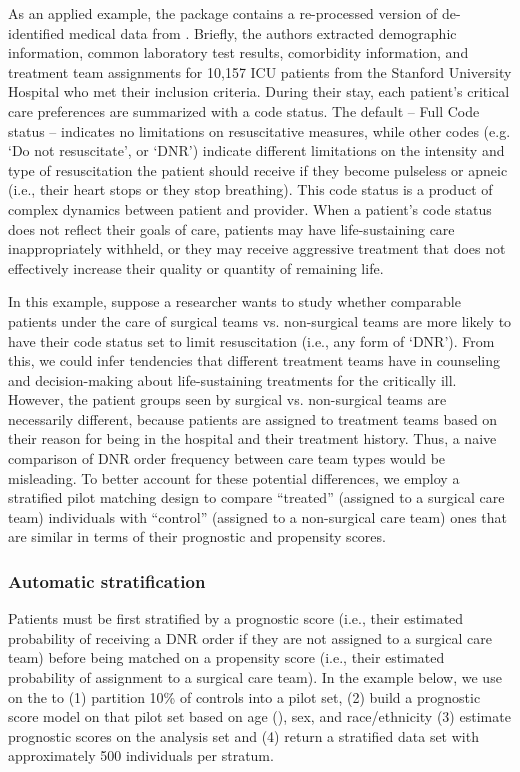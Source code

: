 As an applied example, the  package contains a re-processed version of de-identified medical data from \citet{chavez2018reversals}.  Briefly, the authors extracted demographic information, common laboratory test results, comorbidity information, and treatment team assignments for 10,157 ICU patients from the Stanford University Hospital who met their inclusion criteria. During their stay, each patient's critical care preferences are summarized with a code status.  The default -- Full Code status -- indicates no limitations on resuscitative measures, while other codes (e.g. `Do not resuscitate', or `DNR') indicate different limitations on the intensity and type of resuscitation the patient should receive if they become pulseless or apneic (i.e., their heart stops or they stop breathing). This code status is a product of complex dynamics between patient and provider.  When a patient's code status does not reflect their goals of care, patients may have life-sustaining care inappropriately withheld, or they may receive aggressive treatment that does not effectively increase their quality or quantity of remaining life.

In this example, suppose a researcher wants to study whether comparable patients under the care of surgical teams vs. non-surgical teams are more likely to have their code status set to limit resuscitation (i.e., any form of `DNR'). From this, we could infer tendencies that different treatment teams have in counseling and decision-making about life-sustaining treatments for the critically ill. However, the patient groups seen by surgical vs. non-surgical teams are necessarily different, because patients are assigned to treatment teams based on their reason for being in the hospital and their treatment history. Thus, a naive comparison of DNR order frequency between care team types would be misleading. To better account for these potential differences, we employ a stratified pilot matching design to compare ``treated'' (assigned to a surgical care team) individuals with ``control'' (assigned to a non-surgical care team) ones that are similar in terms of their prognostic and propensity scores.

\subsubsection{Automatic stratification}\label{subsubsec:real_astrat}

Patients must be first stratified by a prognostic score (i.e., their estimated probability of receiving a DNR order if they are not assigned to a surgical care team) before being matched on a propensity score (i.e., their estimated probability of assignment to a surgical care team). In the example below, we use   on the  to (1) partition 10\% of controls into a pilot set, (2) build a prognostic score model on that pilot set based on age (), sex, and race/ethnicity (3) estimate prognostic scores on the analysis set and (4) return a stratified data set with approximately 500 individuals per stratum.

